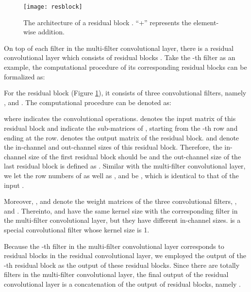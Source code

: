 \documentclass[letterpaper]{article} \usepackage{aaai20}  \usepackage{times}  \usepackage{helvet} \usepackage{courier}  \usepackage[hyphens]{url}  \usepackage{graphicx} \urlstyle{rm} \def\UrlFont{\rm}  \usepackage{graphicx}  \frenchspacing  \setlength{\pdfpagewidth}{8.5in}  \setlength{\pdfpageheight}{11in}
\begin{document}
\begin{figure}[t]
\centering
\texttt{[image: resblock]} 
\caption{The architecture of a residual block . ``+'' represents the element-wise addition.}
\label{fig:resblock}
\end{figure}

On top of each filter in the multi-filter convolutional layer, there is a residual convolutional layer which consists of  residual blocks \cite{he2016deep}. Take the -th filter as an example, the computational procedure of its corresponding residual blocks  can be formalized as:

\begin{algorithm}
\begin{algorithmic}[1]
		\STATE 
        \FOR{ = 1 \TO }
            \STATE  
            \STATE  
        \ENDFOR
        \RETURN 
\end{algorithmic}
\end{algorithm}

For the residual block  (Figure \ref{fig:resblock}), it consists of three convolutional filters, namely ,  and . The computational procedure can be denoted as:


where  indicates the convolutional operations.  denotes the input matrix of this residual block and  indicate the sub-matrices of , starting from the -th row and ending at the  row.  denotes the output matrix of the residual block.  and  denote the in-channel and out-channel sizes of this residual block. Therefore, the in-channel size of the first residual block  should be  and the out-channel size of the last residual block  is defined as . Similar with the multi-filter convolutional layer, we let the row numbers of  as well as ,  and  be , which is identical to that of the input .

Moreover, ,  and  denote the weight matrices of the three convolutional filters, ,  and . Thereinto,  and  have the same kernel size  with the corresponding filter  in the multi-filter convolutional layer, but they have different in-channel sizes.  is a special convolutional filter whose kernel size is 1.

Because the -th filter  in the multi-filter convolutional layer corresponds to  residual blocks  in the residual convolutional layer, we employed the output  of the -th residual block  as the output of these residual blocks. Since there are totally  filters in the multi-filter convolutional layer, the final output of the residual convolutional layer is a concatenation of the output of  residual blocks, namely .
\end{document}
